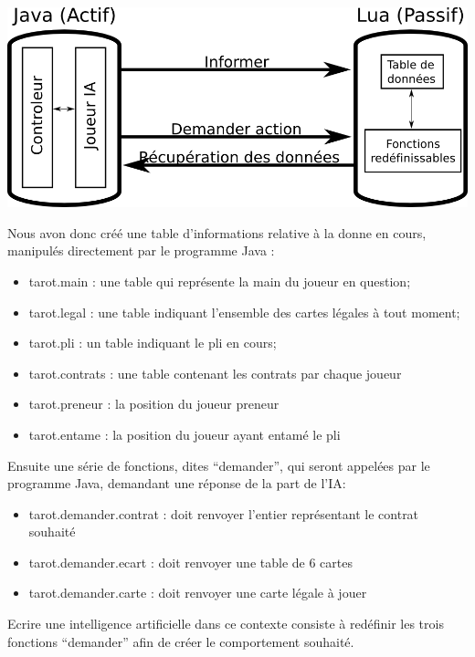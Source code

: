 \documentclass[a4paper]{report}
\begin{document}
			\begin{center}
					\includegraphics[scale=0.3]{Images/javalua.png}
			\end{center}
			\nopagebreak
			Nous avon donc créé une table d'informations relative à la donne en cours, manipulés directement par le programme Java :\\
			\begin{itemize}

			\item tarot.main : une table qui représente la main du joueur en question;

			\item tarot.legal : une table indiquant l’ensemble des cartes légales à tout moment;

			\item tarot.pli : un table indiquant le pli en cours;

			\item tarot.contrats : une table contenant les contrats par chaque joueur
			
			\item tarot.preneur : la position du joueur preneur
		
			\item tarot.entame : la position du joueur ayant entamé le pli
			 
			\end{itemize}
			Ensuite une série de fonctions, dites “demander”, qui seront appelées par le programme Java, demandant une réponse de la part de l’IA:\\
			\begin{itemize}
			    \item tarot.demander.contrat : doit renvoyer l’entier représentant le contrat souhaité
			    \item tarot.demander.ecart : doit renvoyer une table de 6 cartes
			    \item tarot.demander.carte : doit renvoyer une carte légale à jouer
			\end{itemize}
			Ecrire une intelligence artificielle dans ce contexte consiste à redéfinir les trois fonctions “demander” afin de créer le comportement souhaité.\\
\end{document}
